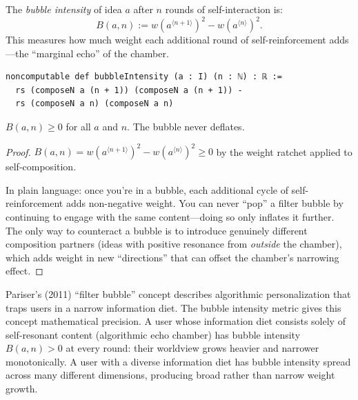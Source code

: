 \begin{definition}
\label{def:bubble-intensity}
The \emph{bubble intensity} of idea $a$ after $n$ rounds of self-interaction
is:
\[
  B(a, n) := w(a^{\langle n+1 \rangle})^2 - w(a^{\langle n \rangle})^2.
\]
This measures how much weight each additional round of self-reinforcement
adds---the ``marginal echo'' of the chamber.

\begin{lstlisting}[caption={Lean 4: Bubble intensity}]
noncomputable def bubbleIntensity (a : I) (n : ℕ) : ℝ :=
  rs (composeN a (n + 1)) (composeN a (n + 1)) -
  rs (composeN a n) (composeN a n)
\end{lstlisting}
\end{definition}

\begin{theorem}
\label{thm:bubble-nonneg}
$B(a, n) \geq 0$ for all $a$ and $n$.  The bubble never deflates.
\end{theorem}

\begin{proof}
$B(a, n) = w(a^{\langle n+1 \rangle})^2 - w(a^{\langle n \rangle})^2 \geq 0$
by the weight ratchet applied to self-composition.

In plain language: once you're in a bubble, each additional cycle of
self-reinforcement adds non-negative weight.  You can never ``pop'' a filter
bubble by continuing to engage with the same content---doing so only
inflates it further.  The only way to counteract a bubble is to introduce
genuinely different composition partners (ideas with positive resonance
from \emph{outside} the chamber), which adds weight in new ``directions''
that can offset the chamber's narrowing effect.
\end{proof}

\begin{remark}
\label{rem:filter-bubbles}
Pariser's (2011) ``filter bubble'' concept describes algorithmic
personalization that traps users in a narrow information diet.  The bubble
intensity metric gives this concept mathematical precision.  A user whose
information diet consists solely of self-resonant content (algorithmic
echo chamber) has bubble intensity $B(a, n) > 0$ at every round: their
worldview grows heavier and narrower monotonically.  A user with a diverse
information diet has bubble intensity spread across many different dimensions,
producing broad rather than narrow weight growth.
\end{remark}


